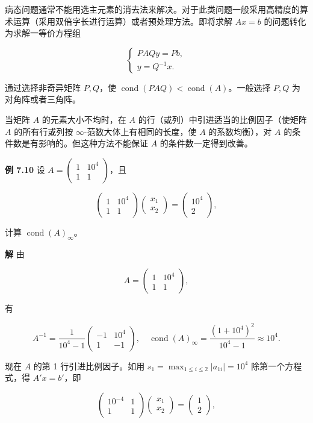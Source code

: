 \documentclass[
  10pt,
  fontset=fandol]{ctexart}
\begin{document}
病态问题通常不能用选主元素的消去法来解决。对于此类问题一般采用高精度的算术运算（采用双倍字长进行运算）或者预处理方法。即将求解 \(Ax=b\) 的问题转化为求解一等价方程组

\[
\begin{cases}
PAQy=Pb,\\
y=Q^{-1}x.
\end{cases}
\]

通过选择非奇异矩阵 \(P,Q\)，使 \(\operatorname{cond}(PAQ)<\operatorname{cond}(A)\)。一般选择 \(P,Q\) 为对角阵或者三角阵。

当矩阵 \(A\) 的元素大小不均时，在 \(A\) 的行（或列）中引进适当的比例因子（使矩阵 \(A\) 的所有行或列按 \(\infty\)-范数大体上有相同的长度，使 \(A\) 的系数均衡），对 \(A\) 的条件数是有影响的。但这种方法不能保证 \(A\) 的条件数一定得到改善。

\textbf{例 7.10} 设 \(A=\begin{pmatrix}1&10^4\\1&1\end{pmatrix}\)，且

\[
\begin{pmatrix}1&10^4\\1&1\end{pmatrix}
\begin{pmatrix}x_1\\x_2\end{pmatrix}
=\begin{pmatrix}10^4\\2\end{pmatrix},
\tag{7.6.9}
\]

计算 \(\operatorname{cond}(A)_\infty\)。

\textbf{解} 由

\[
A=\begin{pmatrix}1&10^4\\1&1\end{pmatrix},
\]

有

\[
A^{-1}=\frac1{10^4-1}\begin{pmatrix}-1&10^4\\1&-1\end{pmatrix},\quad
\operatorname{cond}(A)_\infty=\frac{(1+10^4)^2}{10^4-1}\approx10^4.
\]

现在 \(A\) 的第 1 行引进比例因子。如用 \(s_1=\max_{1\leqslant i\leqslant2}|a_{1i}|=10^4\) 除第一个方程式，得 \(A'x=b'\)，即

\[
\begin{pmatrix}10^{-4}&1\\1&1\end{pmatrix}
\begin{pmatrix}x_1\\x_2\end{pmatrix}
=\begin{pmatrix}1\\2\end{pmatrix},
\tag{7.6.10}
\]
\end{document}
